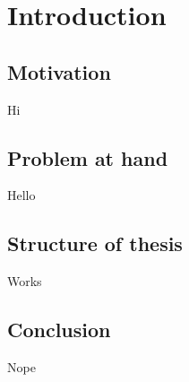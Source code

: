 \chapter{Introduction}
\label{chapter:Introduction}
\thispagestyle{myheadings}

\section{Motivation}
\label{sec:Motivation}
Hi
\section{Problem at hand}
\label{sec:Problem at hand}
Hello
\section{Structure of thesis}
\label{sec:Structure of thesis}
Works
\section{Conclusion}
\label{sec:Conclusion}
Nope
